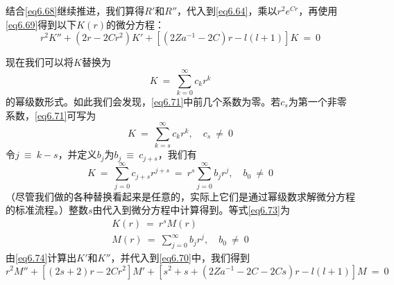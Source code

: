 \documentclass[12pt,a4paper,openany]{ctexbook}
\begin{document}
\begin{flushleft}
结合\eqref{eq6.68}继续推进，我们算得$R'$和$R''$，代入到\eqref{eq6.64}，乘以$r^2e^{Cr}$，再使用\eqref{eq6.69}得到以下$K(r)$的微分方程：
\begin{equation}
    r^2K''+(2r-2Cr^2)K'+[(2Za^{-1}-2C)r-l(l+1)]K\ =\ 0 \label{eq6.70}
\end{equation}

现在我们可以将$K$替换为
\begin{equation}
    K\ =\ \sum_{k=0}^{\infty}c_kr^k \label{eq6.71}
\end{equation}
的幂级数形式。如此我们会发现，\eqref{eq6.71}中前几个系数为零。若$c_s$为第一个非零系数，\eqref{eq6.71}可写为
\begin{equation}
    K\ =\ \sum_{k=s}^{\infty}c_kr^k,\quad c_s\ \neq\ 0 \label{eq6.72}
\end{equation}
令$j\ \equiv\ k-s$，并定义$b_j$为$b_j\ \equiv\ c_{j+s}$，我们有
\begin{equation}
    K\ =\ \sum_{j=0}^{\infty}c_{j+s}r^{j+s}\ =\ r^s\sum_{j=0}^{\infty}b_jr^j,\quad b_0\ \neq\ 0 \label{eq6.73}
\end{equation}
（尽管我们做的各种替换看起来是任意的，实际上它们是通过幂级数求解微分方程的标准流程。）整数$s$由代入到微分方程中计算得到。等式\eqref{eq6.73}为
\begin{gather}
    K(r)\ =\ r^sM(r) \label{eq6.74} \\
    M(r)\ =\ \sum_{j=0}^{\infty}b_jr^j,\quad b_0\ \neq\ 0 \label{eq6.75}
\end{gather}
由\eqref{eq6.74}计算出$K'$和$K''$，并代入到\eqref{eq6.70}中，我们得到
\begin{equation}
    r^2M''+[(2s+2)r-2Cr^2]M'+[s^2+s+(2Za^{-1}-2C-2Cs)r-l(l+1)]M\ =\ 0 \label{eq6.76}
\end{equation}


\end{flushleft}
\end{document}
